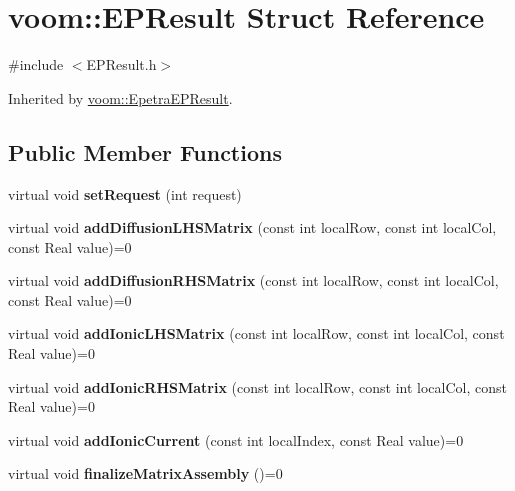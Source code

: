 \hypertarget{structvoom_1_1_e_p_result}{
\section{voom::EPResult Struct Reference}
\label{structvoom_1_1_e_p_result}
}


{\ttfamily \#include $<$EPResult.h$>$}

Inherited by \hyperlink{structvoom_1_1_epetra_e_p_result}{voom::EpetraEPResult}.\subsection*{Public Member Functions}
\begin{DoxyCompactItemize}
\item 
\hypertarget{structvoom_1_1_e_p_result_a39233c0042eba1fccc40806344d599c2}{
virtual void {\bfseries setRequest} (int request)}
\label{structvoom_1_1_e_p_result_a39233c0042eba1fccc40806344d599c2}

\item 
\hypertarget{structvoom_1_1_e_p_result_ab4198fa90af3e30a72757af715b3edac}{
virtual void {\bfseries addDiffusionLHSMatrix} (const int localRow, const int localCol, const Real value)=0}
\label{structvoom_1_1_e_p_result_ab4198fa90af3e30a72757af715b3edac}

\item 
\hypertarget{structvoom_1_1_e_p_result_a38e9fa7ef1fb7f2f06a5ef8985f0440e}{
virtual void {\bfseries addDiffusionRHSMatrix} (const int localRow, const int localCol, const Real value)=0}
\label{structvoom_1_1_e_p_result_a38e9fa7ef1fb7f2f06a5ef8985f0440e}

\item 
\hypertarget{structvoom_1_1_e_p_result_a00b69289a5f6f9599f23d67518792902}{
virtual void {\bfseries addIonicLHSMatrix} (const int localRow, const int localCol, const Real value)=0}
\label{structvoom_1_1_e_p_result_a00b69289a5f6f9599f23d67518792902}

\item 
\hypertarget{structvoom_1_1_e_p_result_a577998fc7a1db4af641a54e146965061}{
virtual void {\bfseries addIonicRHSMatrix} (const int localRow, const int localCol, const Real value)=0}
\label{structvoom_1_1_e_p_result_a577998fc7a1db4af641a54e146965061}

\item 
\hypertarget{structvoom_1_1_e_p_result_a4a6fcb7f460958f84744b4c1bc7a58f5}{
virtual void {\bfseries addIonicCurrent} (const int localIndex, const Real value)=0}
\label{structvoom_1_1_e_p_result_a4a6fcb7f460958f84744b4c1bc7a58f5}

\item 
\hypertarget{structvoom_1_1_e_p_result_aff3e58ad2a02462b5d83bbbcabd949d5}{
virtual void {\bfseries finalizeMatrixAssembly} ()=0}
\label{structvoom_1_1_e_p_result_aff3e58ad2a02462b5d83bbbcabd949d5}

\end{DoxyCompactItemize}


